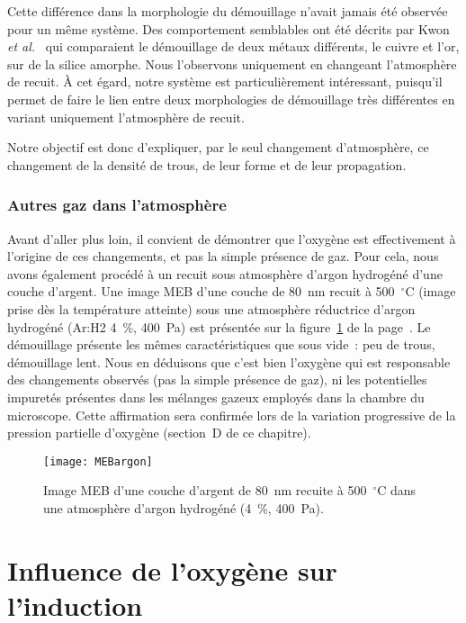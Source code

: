 Cette différence dans la morphologie du démouillage n’avait jamais été observée pour un même système. Des comportement semblables ont été décrits par Kwon \textit{et al.}~\cite{kwon2003comparison} qui comparaient le démouillage de deux métaux différents, le cuivre et l’or, sur de la silice amorphe. Nous l’observons uniquement en changeant l’atmosphère de recuit. À cet égard, notre système est particulièrement intéressant, puisqu’il permet de faire le lien entre deux morphologies de démouillage très différentes en variant uniquement l’atmosphère de recuit.\par 
Notre objectif est donc d’expliquer, par le seul changement d’atmosphère, ce changement de la densité de trous, de leur forme et de leur propagation.\par 

		\subsubsection{Autres gaz dans l’atmosphère}
Avant d’aller plus loin, il convient de démontrer que l’oxygène est effectivement à l’origine de ces changements, et pas la simple présence de gaz. Pour cela, nous avons également procédé à un recuit sous atmosphère d’argon hydrogéné d’une couche d’argent. Une image MEB d’une couche de 80~nm recuit à 500~$^\circ$C (image prise dès la température atteinte) sous une atmosphère réductrice d’argon hydrogéné (Ar:H2 4~\%, 400~Pa) est présentée sur la figure~\ref{MEBargon} de la page~\pageref{MEBargon}. Le démouillage présente les mêmes caractéristiques que sous vide~: peu de trous, démouillage lent. Nous en déduisons que c’est bien l’oxygène qui est responsable des changements observés (pas la simple présence de gaz), ni les potentielles impuretés présentes dans les mélanges gazeux employés dans la chambre du microscope. Cette affirmation sera confirmée lors de la variation progressive de la pression partielle d'oxygène (section~D de ce chapitre).\par 
\begin{figure}[!p]
\centering
\texttt{[image: MEBargon]}
\caption{Image MEB d’une couche d’argent de 80~nm recuite à 500~$^\circ$C dans une atmosphère d’argon hydrogéné (4~\%, 400~Pa).}
\label{MEBargon}
\end{figure}

\section{Influence de l'oxygène sur l'induction}

